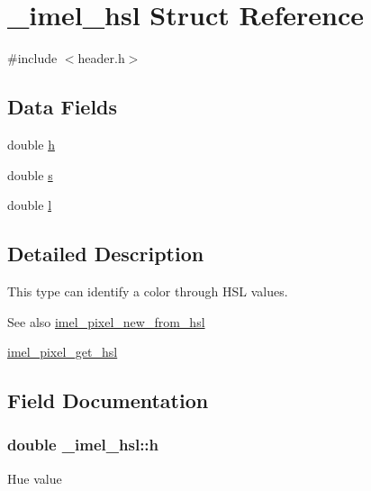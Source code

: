\hypertarget{struct__imel__hsl}{}\section{\+\_\+imel\+\_\+hsl Struct Reference}
\label{struct__imel__hsl}


{\ttfamily \#include $<$header.\+h$>$}

\subsection*{Data Fields}
{\bf }\par
\begin{DoxyCompactItemize}
\item 
double \hyperlink{struct__imel__hsl_a1468000de548dfd05229e36c1a75c783}{h}
\item 
double \hyperlink{struct__imel__hsl_a003fba43e90292648bc7b8095c5b2be3}{s}
\item 
double \hyperlink{struct__imel__hsl_a228f9339990f23bf9731148c13f63a14}{l}
\end{DoxyCompactItemize}



\subsection{Detailed Description}
This type can identify a color through H\+SL values.

\begin{DoxySeeAlso}{See also}
\hyperlink{pixel_8c_a8ba2bb2ac90703240cd2c7556a4b9680}{imel\+\_\+pixel\+\_\+new\+\_\+from\+\_\+hsl} 

\hyperlink{pixel_8c_a29873cfd499af84deec32931e77e178e}{imel\+\_\+pixel\+\_\+get\+\_\+hsl} 
\end{DoxySeeAlso}


\subsection{Field Documentation}
\subsubsection[{\texorpdfstring{h}{h}}]{\setlength{\rightskip}{0pt plus 5cm}double \+\_\+imel\+\_\+hsl\+::h}\hypertarget{struct__imel__hsl_a1468000de548dfd05229e36c1a75c783}{}\label{struct__imel__hsl_a1468000de548dfd05229e36c1a75c783}
Hue value 
